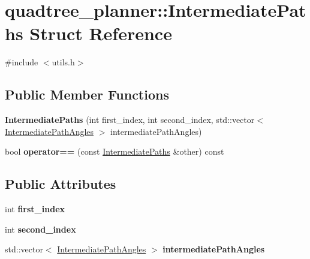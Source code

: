\hypertarget{structquadtree__planner_1_1IntermediatePaths}{}\section{quadtree\+\_\+planner\+:\+:Intermediate\+Paths Struct Reference}
\label{structquadtree__planner_1_1IntermediatePaths}


{\ttfamily \#include $<$utils.\+h$>$}

\subsection*{Public Member Functions}
\begin{DoxyCompactItemize}
\item 
\mbox{\label{structquadtree__planner_1_1IntermediatePaths_a5345b071f834cf2ca9fb0be256f39ea2}} 
{\bfseries Intermediate\+Paths} (int first\+\_\+index, int second\+\_\+index, std\+::vector$<$ \hyperlink{structquadtree__planner_1_1IntermediatePathAngles}{Intermediate\+Path\+Angles} $>$ intermediate\+Path\+Angles)
\item 
\mbox{\label{structquadtree__planner_1_1IntermediatePaths_a6ed4e6644af54586e70e22d34aa9ddfb}} 
bool {\bfseries operator==} (const \hyperlink{structquadtree__planner_1_1IntermediatePaths}{Intermediate\+Paths} \&other) const
\end{DoxyCompactItemize}
\subsection*{Public Attributes}
\begin{DoxyCompactItemize}
\item 
\mbox{\label{structquadtree__planner_1_1IntermediatePaths_a5655dcf69ce97f40f99481f1a2cc8586}} 
int {\bfseries first\+\_\+index}
\item 
\mbox{\label{structquadtree__planner_1_1IntermediatePaths_a6fc49ad9c13a2f3116c7cb288ff6405e}} 
int {\bfseries second\+\_\+index}
\item 
\mbox{\label{structquadtree__planner_1_1IntermediatePaths_adf013ca83453d9254eb015814ca605a7}} 
std\+::vector$<$ \hyperlink{structquadtree__planner_1_1IntermediatePathAngles}{Intermediate\+Path\+Angles} $>$ {\bfseries intermediate\+Path\+Angles}
\end{DoxyCompactItemize}
